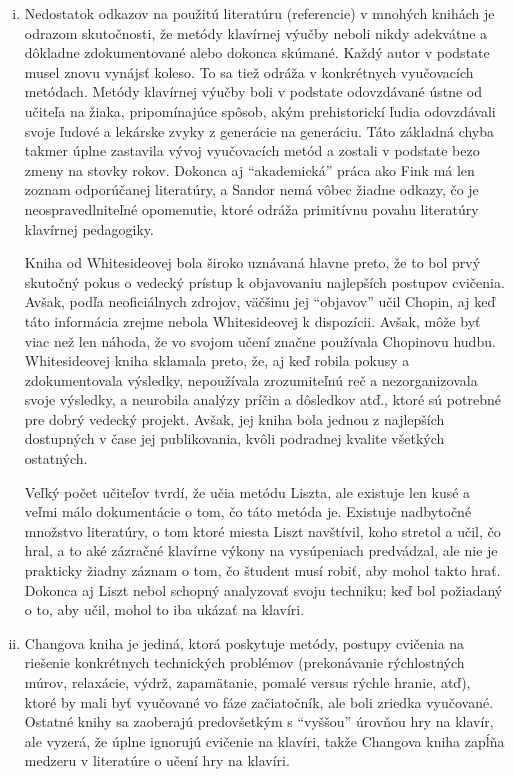 \begin{enumerate}[(i)]
\item Nedostatok odkazov na použitú literatúru (referencie) v mnohých knihách je odrazom skutočnosti, že metódy klavírnej výučby neboli nikdy adekvátne a dôkladne zdokumentované alebo dokonca skúmané. Každý autor v podstate musel znovu vynájsť koleso. To sa tiež odráža v konkrétnych vyučovacích metódach. Metódy klavírnej výučby boli v podstate odovzdávané ústne od učiteľa na žiaka, pripomínajúce spôsob, akým prehistorickí ľudia odovzdávali svoje ľudové a lekárske zvyky z generácie na generáciu. Táto základná chyba takmer úplne zastavila vývoj vyučovacích metód a zostali v podstate bezo zmeny na stovky rokov. Dokonca aj “akademická” práca ako Fink má len zoznam odporúčanej literatúry, a Sandor nemá vôbec žiadne odkazy, čo je neospravedlniteľné opomenutie, ktoré odráža primitívnu povahu literatúry klavírnej pedagogiky. 

Kniha od Whitesideovej bola široko uznávaná hlavne preto, že to bol prvý skutočný pokus o vedecký prístup k objavovaniu najlepších postupov cvičenia. Avšak, podľa neoficiálnych zdrojov, väčšinu jej “objavov” učil Chopin, aj keď táto informácia zrejme nebola Whitesideovej k dispozícii. Avšak, môže byť viac než len náhoda, že vo svojom učení značne používala Chopinovu hudbu. Whitesideovej kniha sklamala preto, že, aj keď robila pokusy a zdokumentovala výsledky, nepoužívala zrozumiteľnú reč a nezorganizovala svoje výsledky, a neurobila analýzy príčin a dôsledkov atď., ktoré sú potrebné pre dobrý vedecký projekt. Avšak, jej kniha bola jednou z najlepších dostupných v čase jej publikovania, kvôli podradnej kvalite všetkých ostatných. 

Veľký počet učiteľov tvrdí, že učia metódu Liszta, ale existuje len kusé a veľmi málo dokumentácie o tom, čo táto metóda je. Existuje nadbytočné množstvo literatúry, o tom ktoré miesta Liszt navštívil, koho stretol a učil, čo hral, a to aké zázračné klavírne výkony na vysúpeniach predvádzal, ale nie je prakticky žiadny záznam o tom, čo študent musí robiť, aby mohol takto hrať. Dokonca aj Liszt nebol schopný analyzovať svoju techniku; keď bol požiadaný o to, aby učil, mohol to iba ukázať na klavíri. 

\item Changova kniha je jediná, ktorá poskytuje metódy, postupy cvičenia na riešenie konkrétnych technických problémov (prekonávanie rýchlostných múrov, relaxácie, výdrž, zapamätanie, pomalé versus rýchle hranie, atď), ktoré by mali byť vyučované vo fáze začiatočník, ale boli zriedka vyučované. Ostatné knihy sa zaoberajú predovšetkým s “vyššou” úrovňou hry na klavír, ale vyzerá, že úplne ignorujú cvičenie na klavíri, takže Changova kniha zapĺňa medzeru v literatúre o učení hry na klavíri. 
\end{enumerate}

